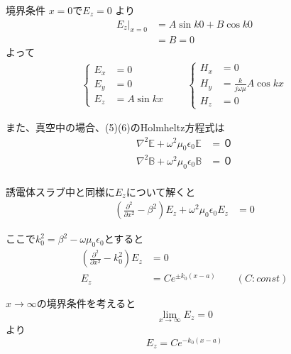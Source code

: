 \documentclass[a4paper,10pt]{bxjsarticle}
\begin{document}
境界条件 $x = 0$で$E_z = 0$ より
\begin{align*}
    E_z|_{x=0} &= A \sin k 0 + B \cos k 0 \\
             &= B = 0 
\end{align*}
よって
\begin{align*}
    \begin{cases}
        E_x &= 0 \\
        E_y &= 0 \\
        E_z &= A \sin k x
    \end{cases} \qquad
    \begin{cases}
        H_x &= 0\\
        H_y &= \frac{k}{j \omega \mu} A \cos kx \\
        H_z &= 0
    \end{cases}
\end{align*}

また、真空中の場合、(5)(6)のHolmheltz方程式は
\begin{align*}
    \nabla^2 \mathbb{E} + \omega^2 \mu_0 \epsilon_0 \mathbb{E} &= ０ \\
    \nabla^2 \mathbb{B} + \omega^2 \mu_0 \epsilon_0 \mathbb{B} &= ０ \\
\end{align*}

誘電体スラブ中と同様に$E_z$について解くと
\begin{align*}
    ( \frac{\partial^2}{\partial x^2} - \beta^2)E_z + \omega^2 \mu_0 \epsilon_0 E_z &= 0
\end{align*}

ここで$k_0^2 = \beta^2 - \omega \mu_0 \epsilon_0$とすると
\begin{align*}
    ( \frac{\partial^2}{\partial x^2} - k_0^2)E_z &= 0 \\
    E_z &= C e^{\pm k_0 (x - a)} \qquad ( C : const)
\end{align*}

$x \rightarrow \infty$の境界条件を考えると
$$ \lim_{x \to \infty} E_z = 0 $$ より
$$ E_z = C e^{- k_0 (x - a)} $$
\end{document}
